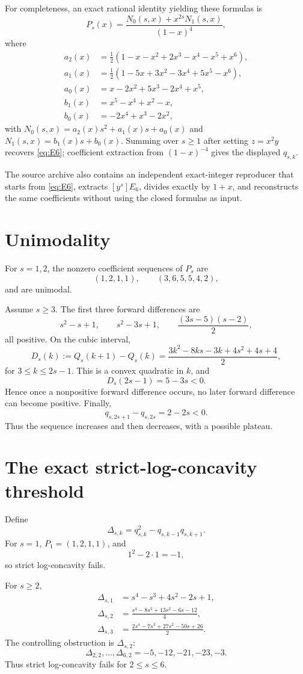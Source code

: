 \documentclass[11pt]{amsart}
\begin{document}
For completeness, an exact rational identity yielding these formulas is
\[
P_s(x)=\frac{N_0(s,x)+x^{2s}N_1(s,x)}{(1-x)^4},
\]
where
\begin{align*}
a_2(x)&=\tfrac12(1-x-x^2+2x^3-x^4-x^5+x^6),\\
a_1(x)&=\tfrac12(1-5x+3x^2-3x^4+5x^5-x^6),\\
a_0(x)&=x-2x^2+5x^3-2x^4+x^5,\\
b_1(x)&=x^5-x^4+x^2-x,\\
b_0(x)&=-2x^4+x^3-2x^2,
\end{align*}
with \(N_0(s,x)=a_2(x)s^2+a_1(x)s+a_0(x)\) and \(N_1(s,x)=b_1(x)s+b_0(x)\).
Summing over \(s\ge1\) after setting \(z=x^2y\) recovers \eqref{eq:E6}; coefficient extraction from \((1-x)^{-4}\) gives the displayed \(q_{s,k}\).

The source archive also contains an independent exact-integer reproducer that starts from \eqref{eq:E6}, extracts \([y^s]E_6\), divides exactly by \(1+x\), and reconstructs the same coefficients without using the closed formulas as input.

\section{Unimodality}
For \(s=1,2\), the nonzero coefficient sequences of \(P_s\) are
\[
(1,2,1,1),\qquad (3,6,5,5,4,2),
\]
and are unimodal.

Assume \(s\ge3\). The first three forward differences are
\[
s^2-s+1,\qquad s^2-3s+1,\qquad \frac{(3s-5)(s-2)}2,
\]
all positive. On the cubic interval,
\[
D_s(k):=Q_s(k+1)-Q_s(k)
=\frac{3k^2-8ks-3k+4s^2+4s+4}{2},
\]
for \(3\le k\le2s-1\). This is a convex quadratic in \(k\), and
\[
D_s(2s-1)=5-3s<0.
\]
Hence once a nonpositive forward difference occurs, no later forward difference can become positive. Finally,
\[
q_{s,2s+1}-q_{s,2s}=2-2s<0.
\]
Thus the sequence increases and then decreases, with a possible plateau.

\section{The exact strict-log-concavity threshold}
Define
\[
\Delta_{s,k}=q_{s,k}^2-q_{s,k-1}q_{s,k+1}.
\]
For \(s=1\), \(P_1=(1,2,1,1)\), and
\[
1^2-2\cdot1=-1,
\]
so strict log-concavity fails.

For \(s\ge2\),
\begin{align}
\Delta_{s,1}&=s^4-s^3+4s^2-2s+1,\label{eq:d1}\\
\Delta_{s,2}&=\frac{s^4-8s^3+13s^2-6s-12}{4},\label{eq:d2}\\
\Delta_{s,3}&=\frac{2s^4-7s^3+27s^2-50s+26}{2}.\label{eq:d3}
\end{align}
The controlling obstruction is \(\Delta_{s,2}\):
\[
\Delta_{2,2},\ldots,\Delta_{6,2}=-5,-12,-21,-23,-3.
\]
Thus strict log-concavity fails for \(2\le s\le6\).
\end{document}
